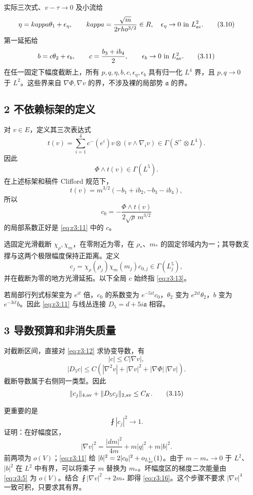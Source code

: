 \documentclass[UTF8,11pt,fontset=none]{ctexart}
\begin{document}
实际三次式、\(v-\tau\to0\) 及小流给 \[
 \eta=\kappa\theta_1+\epsilon_\eta,
 \qquad \kappa=\frac{\sqrt m}{2\rho^{3/2}}\in\mathbb R,
 \quad \epsilon_\eta\to0\text{ in }L^2_{\rm av}.
 \tag{3.10}\label{eq:r3:10}
\] 第一延拓给 \[
 b=c\theta_2+\epsilon_b,\qquad
 c=\frac{b_3+ib_4}{2},\qquad \epsilon_b\to0\text{ in }L^2_{\rm av}.
 \tag{3.11}\label{eq:r3:11}
\] 在任一固定下幅度截断上，所有 \(p,q,\eta,b,c,\epsilon_\eta,\epsilon_b\) 具有归一化 \(L^4\) 界，且 \(p,q\to0\) 于 \(L^2\)。这些界来自 \(\nabla\Phi,\nabla v\) 的界，不涉及裸的局部势 \(\mathfrak a\) 的界。

\subsection{2 不依赖标架的定义}\label{ch3:ux4e0dux4f9dux8d56ux6807ux67b6ux7684ux5b9aux4e49}

对 \(v\in E\)，定义其三次表达式 \[
 t(v)=\sum_{i=1}^4 c^-(e^i)v\otimes(v\wedge\nabla_i v)
       \in\Gamma(S^+\otimes L^4).
\] 因此 \[
 \Phi\wedge t(v)\in\Gamma(L^5).
\] 在上述标架和稿件 Clifford 规范下， \[
 t(v)=m^{3/2}(-b_1+ib_2,-b_3-ib_4),
\] 所以 \[
 c_0=-\frac{\Phi\wedge t(v)}{2\sqrt\rho\,m^{3/2}}
 \tag{3.12}\label{eq:r3:12}
\] 的局部系数正好是 \eqref{eq:r3:11} 中的 \(c\)。

选固定光滑截断 \(\chi_\rho,\chi_m\)，在零附近为零，在 \(\rho_*\)、\(m_*\) 的固定邻域内为一；其导数支撑与这两个极限幅度保持正距离。定义 \[
 c_j=\chi_\rho(\rho_j)\chi_m(m_j)c_{0,j}\in\Gamma(L_j^5),
 \tag{3.13}\label{eq:r3:13}
\] 并在截断为零的地方光滑延拓。以下全局 \(c\) 始终指 \eqref{eq:r3:13}。

若局部行列式标架变为 \(e^{it}\) 倍，\(c_0\) 的系数变为 \(e^{-5it}c_0\)，\(\theta_2\) 变为 \(e^{2it}\theta_2\)，\(b\) 变为 \(e^{-3it}b\)。因此 \eqref{eq:r3:11} 与线丛连接 \(D_5=d+5i\mathfrak a\) 相容。

\subsection{3 导数预算和非消失质量}\label{ch3:ux5bfcux6570ux9884ux7b97ux548cux975eux6d88ux5931ux8d28ux91cf}

对截断区间，直接对 \eqref{eq:r3:12} 求协变导数，有 \[
 |c|\le C|\nabla v|,
\] \[
 |D_5c|\le C\left(|\nabla^2v|+|\nabla v|^2
                         +|\nabla\Phi|\,|\nabla v|\right).
 \tag{3.14}\label{eq:r3:14}
\] 截断导数属于右侧同一类型。因此 \[
 \|c_j\|_{4,\rm av}+\|D_5c_j\|_{2,\rm av}\le C_K.
 \tag{3.15}\label{eq:r3:15}
\]

更重要的是 \[
 \boxed{\fint|c_j|^2\longrightarrow1.}
 \tag{3.16}\label{eq:r3:16}
\] 证明：在好幅度区， \[
 |\nabla v|^2=\frac{|dm|^2}{4m}+m|q|^2+m|b|^2.
\] 前两项为 \(o(V)\)；\eqref{eq:r3:11} 给 \(|b|^2=2|c_0|^2+o_{L^1_{\rm av}}(1)\)。由于 \(m-m_*\to0\) 于 \(L^2\)、\(|b|^2\) 在 \(L^2\) 中有界，可以将乘子 \(m\) 替换为 \(m_*\)。坏幅度区的梯度二次能量由 \eqref{eq:r3:5} 为 \(o(V)\)。结合 \(\fint|\nabla v|^2\to2m_*\) 即得 \eqref{eq:r3:16}。这个步骤不要求 \(|\nabla v|^4\) 一致可积，只要求其有界。
\end{document}
